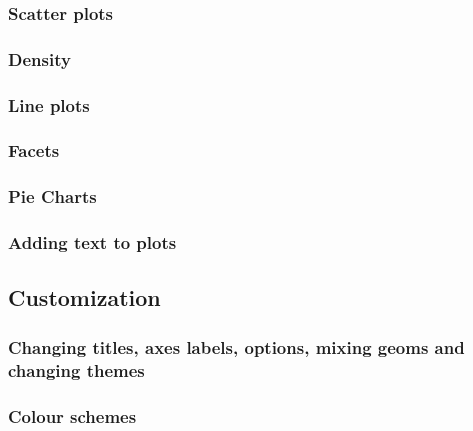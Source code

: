 \documentclass[]{gitbook}
\begin{document}
\hypertarget{scatter-plots}{%
\subsubsection{Scatter plots}\label{scatter-plots}}

\hypertarget{density}{%
\subsubsection{Density}\label{density}}

\hypertarget{line-plots}{%
\subsubsection{Line plots}\label{line-plots}}

\hypertarget{facets}{%
\subsubsection{Facets}\label{facets}}

\hypertarget{pie-charts}{%
\subsubsection{Pie Charts}\label{pie-charts}}

\hypertarget{adding-text-to-plots}{%
\subsubsection{Adding text to plots}\label{adding-text-to-plots}}

\hypertarget{customization}{%
\subsection{Customization}\label{customization}}

\hypertarget{changing-titles-axes-labels-options-mixing-geoms-and-changing-themes}{%
\subsubsection{Changing titles, axes labels, options, mixing geoms and changing themes}\label{changing-titles-axes-labels-options-mixing-geoms-and-changing-themes}}

\hypertarget{colour-schemes}{%
\subsubsection{Colour schemes}\label{colour-schemes}}
\end{document}
